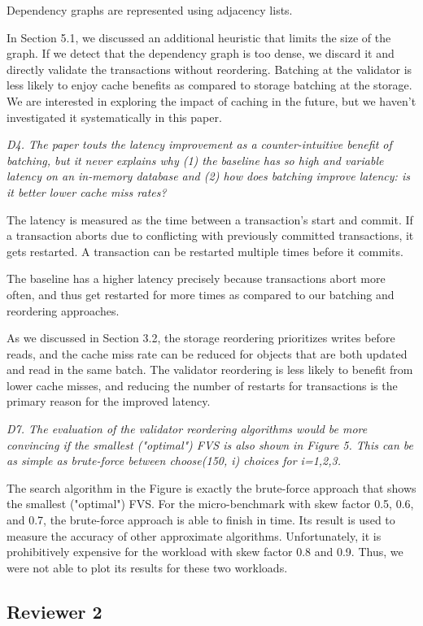 \documentclass{article}
\begin{document}
Dependency graphs are represented using adjacency lists.

In Section 5.1, we discussed an additional heuristic that limits the size of the graph. If we detect that the dependency graph is too dense, we discard it and directly validate the transactions without reordering. Batching at the validator is less likely to enjoy cache benefits as compared to storage batching at the storage. We are interested in exploring the impact of caching in the future, but we haven't investigated it systematically in this paper.

\emph{D4. The paper touts the latency improvement as a counter-intuitive benefit of batching, but it never explains why (1) the baseline has so high and variable latency on an in-memory database and (2) how does batching improve latency: is it better lower cache miss rates?}

The latency is measured as the time between a transaction's start and commit. If a transaction aborts due to conflicting with previously committed transactions, it gets restarted. A transaction can be restarted multiple times before it commits. 

The baseline has a higher latency precisely because transactions abort more often, and thus get restarted for more times as compared to our batching and reordering approaches. 

As we discussed in Section 3.2, the storage reordering prioritizes writes before reads, and the cache miss rate can be reduced for objects that are both updated and read in the same batch. The validator reordering is less likely to benefit from lower cache misses, and reducing the number of restarts for transactions is the primary reason for the improved latency.

\emph{D7. The evaluation of the validator reordering algorithms would be more convincing if the smallest ("optimal") FVS is also shown in Figure 5. This can be as simple as brute-force between choose(150, i) choices for i=1,2,3.}

The search algorithm in the Figure is exactly the brute-force approach that shows the smallest ("optimal") FVS. For the micro-benchmark with skew factor 0.5, 0.6, and 0.7, the brute-force approach is able to finish in time. Its result is used to measure the accuracy of other approximate algorithms. Unfortunately, it is prohibitively expensive for the workload with skew factor 0.8 and 0.9. Thus, we were not able to plot its results for these two workloads.

\subsection{Reviewer 2}
\end{document}
